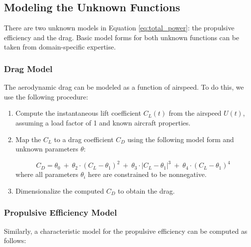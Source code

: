 \documentclass[conf]{new-aiaa}
\begin{document}
    \subsection{Modeling the Unknown Functions}
    \label{subsec:modeling_unknown_functions}

    There are two unknown models in Equation \ref{eq:total_power}: the propulsive efficiency and the drag. Basic model forms for both unknown functions can be taken from domain-specific expertise.

    \subsubsection{Drag Model}
    \label{subsubsec:drag_model}
    The aerodynamic drag can be modeled as a function of airspeed. To do this, we use the following procedure:

    \begin{enumerate}
        \item Compute the instantaneous lift coefficient $C_L(t)$ from the airspeed $U(t)$, assuming a load factor of 1 and known aircraft properties.
        \item Map the $C_L$ to a drag coefficient $C_D$ using the following model form and unknown parameters $\theta$:

        \begin{equation*}
            C_D =
            \theta_0
            \: + \: \theta_2 \cdot (C_L - \theta_1)^2
            \: + \: \theta_3 \cdot |C_L - \theta_1|^3
            \: + \: \theta_4 \cdot (C_L - \theta_1)^4
            \label{eq:drag_coefficient}
        \end{equation*}
        \noindent where all parameters $\theta_i$ here are constrained to be nonnegative.
        \item Dimensionalize the computed $C_D$ to obtain the drag.
    \end{enumerate}

    \subsubsection{Propulsive Efficiency Model}
    \label{subsubsec:propulsive_efficiency_model}

    Similarly, a characteristic model for the propulsive efficiency can be computed as follows:
\end{document}

